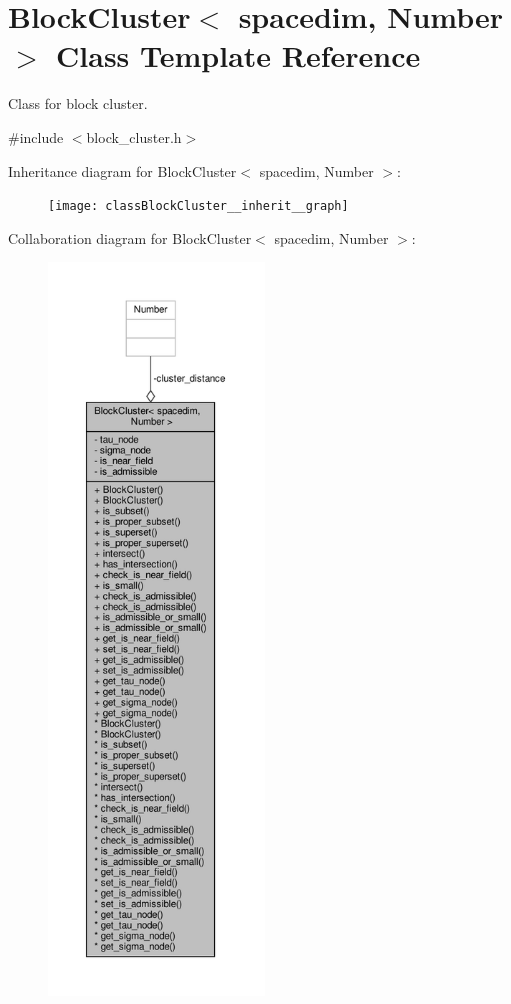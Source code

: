 \hypertarget{classBlockCluster}{}\section{Block\+Cluster$<$ spacedim, Number $>$ Class Template Reference}
\label{classBlockCluster}


Class for block cluster.  




{\ttfamily \#include $<$block\+\_\+cluster.\+h$>$}



Inheritance diagram for Block\+Cluster$<$ spacedim, Number $>$\+:\nopagebreak
\begin{figure}[H]
\begin{center}
\leavevmode
\texttt{[image: classBlockCluster\_\_inherit\_\_graph]}
\end{center}
\end{figure}


Collaboration diagram for Block\+Cluster$<$ spacedim, Number $>$\+:
\nopagebreak
\begin{figure}[H]
\begin{center}
\leavevmode
\includegraphics[height=550pt]{classBlockCluster__coll__graph}
\end{center}
\end{figure}
